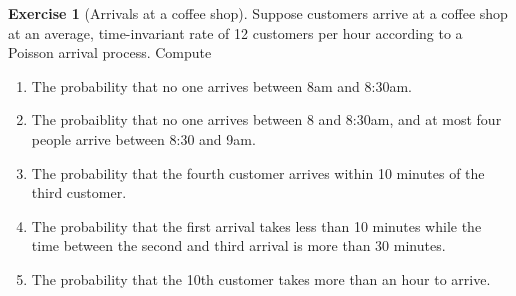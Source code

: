 \documentclass[11pt]{article}
\theoremstyle{definition}
\newtheorem{exercise}[]{Exercise}
\begin{document}
\begin{exercise}[Arrivals at a coffee shop]
Suppose customers arrive at a coffee shop at an average, time-invariant
rate of 12 customers per hour according to a Poisson arrival process.
%
%
%
Compute

\begin{enumerate}[label = (\alph*)]
  \item The probability that no one arrives between 8am and 8:30am.
  \item The probaiblity that no one arrives between 8 and 8:30am,
  and at most four people arrive between 8:30 and 9am.
  \item The probability that the fourth customer arrives within 10 minutes
  of the third customer.
  \item The probability that the first arrival takes less than 10 minutes
  while the time between the second and third arrival is more than 30 minutes.
  \item The probability that the 10th customer takes more than an hour to arrive.
\end{enumerate}

\end{exercise}
\end{document}
